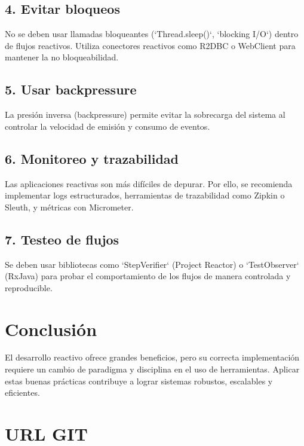 \documentclass[12pt]{article}
\begin{document}
\subsection{4. Evitar bloqueos}
No se deben usar llamadas bloqueantes (`Thread.sleep()`, `blocking I/O`) dentro de flujos reactivos. Utiliza conectores reactivos como R2DBC o WebClient para mantener la no bloqueabilidad.

\subsection{5. Usar backpressure}
La presión inversa (backpressure) permite evitar la sobrecarga del sistema al controlar la velocidad de emisión y consumo de eventos.

\subsection{6. Monitoreo y trazabilidad}
Las aplicaciones reactivas son más difíciles de depurar. Por ello, se recomienda implementar logs estructurados, herramientas de trazabilidad como Zipkin o Sleuth, y métricas con Micrometer.

\subsection{7. Testeo de flujos}
Se deben usar bibliotecas como `StepVerifier` (Project Reactor) o `TestObserver` (RxJava) para probar el comportamiento de los flujos de manera controlada y reproducible.

\section{Conclusión}
El desarrollo reactivo ofrece grandes beneficios, pero su correcta implementación requiere un cambio de paradigma y disciplina en el uso de herramientas. Aplicar estas buenas prácticas contribuye a lograr sistemas robustos, escalables y eficientes.

\section{URL GIT}
\href{https://github.com/GersonEscobar99/buenas-practicas-de-aplicaciones-reactivas.git} 

\printbibliography
\end{document}
